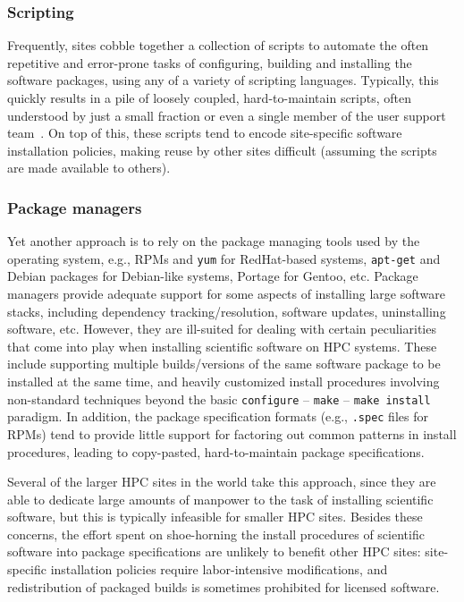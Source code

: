 \subsubsection{Scripting}

Frequently, sites cobble together a collection of scripts to automate the often repetitive and error-prone tasks of
configuring, building and installing the software packages, using any of a variety of scripting languages. Typically, this quickly results in a pile of
loosely coupled, hard-to-maintain scripts, often
understood by just a small fraction or even a single member of the user support
team~\cite{Jim}. On top of this, these
scripts tend to encode site-specific software installation policies, making reuse by other sites difficult (assuming the scripts
are made available to others).

\subsubsection{Package managers}

Yet another approach is to rely on the package managing tools used
by the operating system, e.g., RPMs and \texttt{\small yum} for RedHat-based systems,
\texttt{\small apt-get} and Debian packages for Debian-like systems, Portage for
Gentoo, etc.
Package managers provide adequate support for some aspects of
installing large software stacks, including dependency tracking/resolution, software
updates, uninstalling software, etc. However, they are ill-suited for dealing with
certain peculiarities that come into play when installing scientific software on
HPC systems. These include supporting multiple builds/versions of the same software package
to be installed at the same time, and heavily customized install procedures involving
non-standard techniques beyond the basic \texttt{\small configure} --
\texttt{\small make} -- \texttt{\small make install} paradigm. In addition, the package specification formats (e.g.,
\texttt{\small .spec} files for RPMs) tend to provide little support for factoring out
common patterns in install procedures, leading to copy-pasted, hard-to-maintain package specifications.

Several of the larger HPC sites in the world take this approach, since they are able to dedicate large amounts of manpower to
the task of installing scientific software, but this is typically infeasible for
smaller HPC sites. Besides these concerns, the effort spent on
shoe-horning the install procedures of scientific software into package
specifications are unlikely to benefit other HPC sites: 
site-specific installation policies require labor-intensive modifications, and
redistribution of packaged builds is sometimes prohibited for
licensed software.

